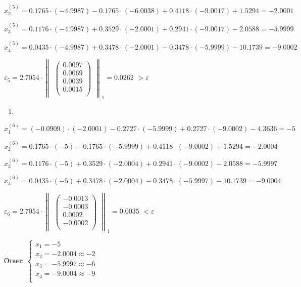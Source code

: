\documentclass[10pt, a4paper]{scrartcl}
\begin{document}
\(\displaystyle x_2^{(5)} = 0.1765\cdot(-4.9987) - 0.1765\cdot(-6.0038) + 0.4118\cdot(-9.0017) + 1.5294 = -2.0001\)

\(\displaystyle x_3^{(5)} = 0.1176\cdot(-4.9987) + 0.3529\cdot(-2.0001) + 0.2941\cdot(-9.0017) - 2.0588= -5.9999\)

\(\displaystyle x_4^{(5)} = 0.0435\cdot(-4.9987) + 0.3478\cdot(-2.0001) - 0.3478\cdot(-5.9999) - 10.1739 = -9.0002\)

\(\displaystyle \varepsilon_5 = 2.7054 \cdot \begin{Vmatrix}\begin{pmatrix} 0.0097\\ 0.0069\\ 0.0039\\ 0.0015\\ \end{pmatrix}\end{Vmatrix} _1 = \mathbf{0.0262}\)
\(\displaystyle > \varepsilon\)

\begin{enumerate}
\def\labelenumi{\arabic{enumi})}
\setcounter{enumi}{5}
\item
\end{enumerate}

\(\displaystyle x_1^{(6)} = (-0.0909)\cdot(-2.0001) - 0.2727\cdot(-5.9999) + 0.2727\cdot(-9.0002) - 4.3636 = -5\)

\(\displaystyle x_2^{(6)} = 0.1765\cdot(-5) - 0.1765\cdot(-5.9999) + 0.4118\cdot(-9.0002) + 1.5294 = -2.0004\)

\(\displaystyle x_3^{(6)} = 0.1176\cdot(-5) + 0.3529\cdot(-2.0004) + 0.2941\cdot(-9.0002) - 2.0588= -5.9997\)

\(\displaystyle x_4^{(6)} = 0.0435\cdot(-5) + 0.3478\cdot(-2.0004) - 0.3478\cdot(-5.9997) - 10.1739 = -9.0004\)

\(\displaystyle \varepsilon_6 = 2.7054 \cdot \begin{Vmatrix}\begin{pmatrix} -0.0013\\ -0.0003\\ 0.0002\\ -0.0002\\ \end{pmatrix}\end{Vmatrix} _1 = \mathbf{0.0035}\)
\(\displaystyle < \varepsilon\)

Ответ:
\(\displaystyle \begin{cases} x_1 = -5\\ x_2 = -2.0004 \approx -2\\ x_3 = -5.9997 \approx -6\\ x_4 = -9.0004 \approx -9\\ \end{cases}\)
\end{document}
